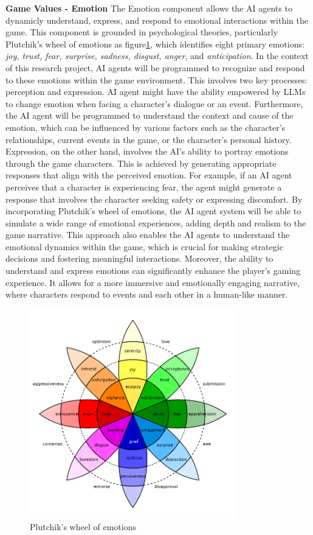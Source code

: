 \textbf{Game Values - Emotion}\quad
The Emotion component allows the AI agents to dynamicly understand, express, and respond to emotional interactions within the game. 
This component is grounded in psychological theories, particularly Plutchik's wheel of emotions as figure\ref{fig:emotions}, which identifies eight primary emotions: \textit{joy, trust, fear, surprise, sadness, disgust, anger}, and \textit{anticipation}\cite{plutchik1980general}. 
In the context of this research project, AI agents will be programmed to recognize and respond to these emotions within the game environment. 
This involves two key processes: perception and expression. AI agent might have the ability empowered by LLMs to change emotion when facing a character's dialogue or an event. 
Furthermore, the AI agent will be programmed to understand the context and cause of the emotion, which can be influenced by various factors such as the character's relationships, current events in the game, or the character's personal history. 
Expression, on the other hand, involves the AI's ability to portray emotions through the game characters. 
This is achieved by generating appropriate responses that align with the perceived emotion. 
For example, if an AI agent perceives that a character is experiencing fear, the agent might generate a response that involves the character seeking safety or expressing discomfort. 
By incorporating Plutchik's wheel of emotions, the AI agent system will be able to simulate a wide range of emotional experiences, adding depth and realism to the game narrative. 
This approach also enables the AI agents to understand the emotional dynamics within the game, which is crucial for making strategic decisions and fostering meaningful interactions. 
Moreover, the ability to understand and express emotions can significantly enhance the player's gaming experience. 
It allows for a more immersive and emotionally engaging narrative, where characters respond to events and each other in a human-like manner. 
\begin{figure}
    \centering
    \includegraphics[width=0.8\textwidth]{image/Plutchik-wheel.png}
    \caption{Plutchik's wheel of emotions}
  \label{fig:emotions}
\end{figure}

